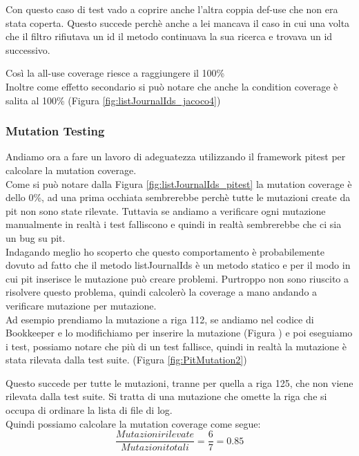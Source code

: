 \documentclass[12pt, a4paper]{article}
\begin{document}
Con questo caso di test vado a coprire anche l'altra coppia def-use che non era stata coperta.
Questo succede perchè anche a lei mancava il caso in cui una volta che il filtro rifiutava un id il
metodo continuava la sua ricerca e trovava un id successivo.

Così la all-use coverage riesce a raggiungere il 100\% \\ 

Inoltre come effetto secondario si può notare che anche
la condition coverage è salita al 100\% (Figura \ref{fig:listJournalIds_jacoco4})

\subsubsection{Mutation Testing}
Andiamo ora a fare un lavoro di adeguatezza utilizzando il framework pitest per calcolare la mutation coverage. \\
Come si può notare dalla Figura \ref{fig:listJournalIds_pitest} la mutation coverage è dello 0\%, ad una prima occhiata
sembrerebbe perchè tutte le mutazioni create da pit non sono state rilevate. Tuttavia se andiamo a verificare 
ogni mutazione manualmente in realtà i test falliscono e quindi in realtà sembrerebbe che ci sia un bug su pit. \\
Indagando meglio ho scoperto che questo comportamento è probabilemente dovuto ad fatto che il metodo listJournalIds
è un metodo statico e per il modo in cui pit inserisce le mutazione può creare problemi. Purtroppo non sono riuscito a 
risolvere questo problema, quindi calcolerò la coverage a mano andando a verificare mutazione per mutazione. \\

Ad esempio prendiamo la mutazione a riga 112, se andiamo nel codice di Bookkeeper e lo modifichiamo per inserire
la mutazione (Figura ) e poi eseguiamo i test, possiamo notare che più di un test fallisce, quindi
in realtà la mutazione è stata rilevata dalla test suite. (Figura \ref{fig:PitMutation2})

Questo succede per tutte le mutazioni, tranne per quella a riga 125, che non viene rilevata dalla test suite. Si tratta 
di una mutazione che omette la riga che si occupa di ordinare la lista di file di log. \\

Quindi possiamo calcolare la mutation coverage come segue:
\[\frac{{Mutazioni rilevate}}{{Mutazioni totali}} = \frac{{6}}{{7}} = 0.85\]
\end{document}
